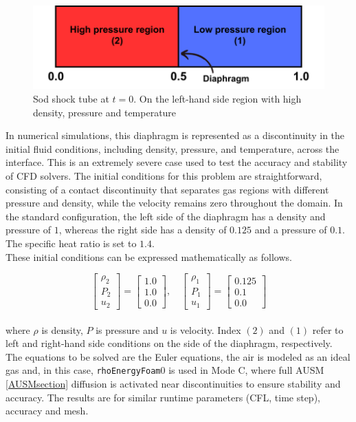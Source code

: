 \documentclass[a5paper]{sapthesis}
\begin{document}
	\begin{figure}[h]
		\centering
		\includegraphics[width=0.8 \linewidth]{Figures/SOD_TUBE_GEOMETRY}
		\caption{Sod shock tube at $t = 0$. On the left-hand side region with high density, pressure and temperature}
		\label{Sod_geometry}
	\end{figure} 
	
	\noindent In numerical simulations, this diaphragm is represented as a discontinuity in the initial fluid conditions, including density, pressure, and temperature, across the interface. This is an extremely severe case used to test the accuracy and stability of CFD solvers. The initial conditions for this problem are straightforward, consisting of a contact discontinuity that separates gas regions with different pressure and density, while the velocity remains zero throughout the domain. In the standard configuration, the left side of the diaphragm has a density and pressure of $1$, whereas the right side has a density of $0.125$ and a pressure of $0.1$. The specific heat ratio is set to $1.4$.\\
	These initial conditions can be expressed mathematically as follows. 
	
	\begin{equation}
		\begin{bmatrix}
			\rho_2\\
			P_2\\
			u_2
		\end{bmatrix}
		=
		\begin{bmatrix}
			1.0\\
			1.0\\
			0.0
		\end{bmatrix},
		\quad
		\begin{bmatrix}
			\rho_1\\
			P_1\\
			u_1
		\end{bmatrix}
		=
		\begin{bmatrix}
			0.125\\
			0.1\\
			0.0
		\end{bmatrix}
	\end{equation}
	\\
	where $\rho$ is density, $P$ is pressure and $u$ is velocity. Index $(2)$ and $(1)$ refer to left and right-hand side conditions on the side of the diaphragm, respectively. The equations to be solved are the Euler equations, the air is modeled as an ideal gas and, in this case, \texttt{rhoEnergyFoam}0 is used in Mode C, where full AUSM \ref{AUSMsection} diffusion is activated near discontinuities to ensure stability and accuracy. The results
	are for similar runtime parameters (CFL, time step), accuracy and mesh. 
\end{document}
